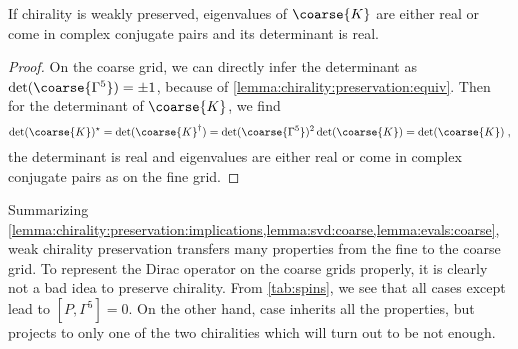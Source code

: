 
\begin{lemma} \label{lemma:evals:coarse}
If chirality is weakly preserved, eigenvalues of $\coarse{K}$ are either real or come in complex conjugate pairs and its determinant is real.
\end{lemma}

\begin{proof}
On the coarse grid, we can directly infer the determinant as $\det(\coarse{\Gamma^{5}}) = \pm 1$, because of \cref{lemma:chirality:preservation:equiv}.
Then for the determinant of $\coarse{K}$, we find
\begin{equation}
\det(\coarse{K})^{\star} =
\det(\coarse{K}^{\dagger}) =
\det(\coarse{\Gamma^{5}})^{2} \det(\coarse{K}) =
\det(\coarse{K}) \;,
\end{equation}
\ie the determinant is real and eigenvalues are either real or come in complex conjugate pairs as on the fine grid.
\end{proof}


Summarizing \cref{lemma:chirality:preservation:implications,lemma:svd:coarse,lemma:evals:coarse}, weak chirality preservation transfers many properties from the fine to the coarse grid.
To represent the Dirac operator on the coarse grids properly, it is clearly not a bad idea to preserve chirality.
From \cref{tab:spins}, we see that all cases except  lead to $[P, \Gamma^{5}]=0$.
On the other hand, case  inherits all the properties, but projects to only one of the two chiralities which will turn out to be not enough.



